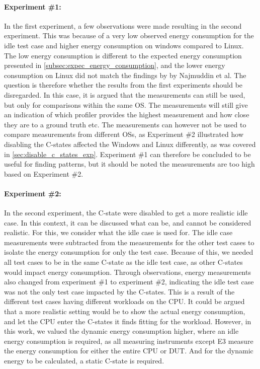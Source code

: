 \paragraph*{Experiment \#1:} In the first experiment, a few observations were made resulting in the second experiment. This was because of a very low observed energy consumption for the idle test case and higher energy consumption on windows compared to Linux. The low energy consumption is different to the expected energy consumption presented in \cref{subsec:expec_energy_consumption}, and the lower energy consumption on Linux did not match the findings by by Najmuddin et al.\cite[]{Najmuddin2021} The question is therefore whether the results from the first experiments should be disregarded. In this case, it is argued that the measurements can still be used, but only for comparisons within the same OS. The measurements will still give an indication of which profiler provides the highest measurement and how close they are to a ground truth etc. The measurements can however not be used to compare measurements from different OSs, as Experiment \#2 illustrated how disabling the C-states affected the Windows and Linux differently, as was covered in \cref{sec:disable_c_states_exp}. Experiment \#1 can therefore be concluded to be useful for finding patterns, but it should be noted the measurements are too high based on Experiment \#2.

\paragraph*{Experiment \#2:} In the second experiment, the C-state were disabled to get a more realistic idle case. In this context, it can be discussed what can be, and cannot be considered realistic. For this, we consider what the idle case is used for. The idle case measurements were subtracted from the measurements for the other test cases to isolate the energy consumption for only the test case. Because of this, we needed all test cases to be in the same C-state as the idle test case, as other C-states would impact energy consumption. Through observations, energy measurements also changed from experiment \#1 to experiment \#2, indicating the idle test case was not the only test case impacted by the C-states. This is a result of the different test cases having different workloads on the CPU. It could be argued that a more realistic setting would be to show the actual energy consumption, and let the CPU enter the C-states it finds fitting for the workload. However, in this work, we valued the dynamic energy consumption higher, where an idle energy consumption is required, as all measuring instruments except E3 measure the energy consumption for either the entire CPU or DUT. And for the dynamic energy to be calculated, a static C-state is required.


